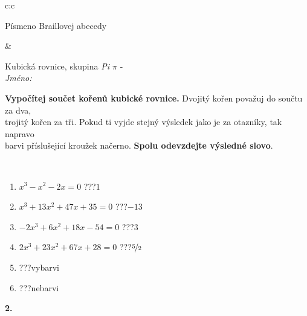 \documentclass[10pt]{report}
\begin{document}
\begin{tabular}{c:c}
\begin{minipage}[c][104.5mm][t]{0.5\linewidth}
\begin{center}
\begin{minipage}{0.20\linewidth}
\begin{center}
{\small Písmeno Braillovej abecedy}
\end{center}
\end{minipage}
\end{center}
\end{minipage}
&
\begin{minipage}[c][104.5mm][t]{0.5\linewidth}
\begin{center}
\vspace{7mm}
{\huge Kubická rovnice, skupina \textit{Pi $\pi$} -}\\[5mm]
\textit{Jméno:}\phantom{xxxxxxxxxxxxxxxxxxxxxxxxxxxxxxxxxxxxxxxxxxxxxxxxxxxxxxxxxxxxxxxxx}\\[5mm]
\begin{minipage}{0.95\linewidth}
\begin{center}
\textbf{Vypočítej součet kořenů kubické rovnice.} Dvojitý kořen považuj do součtu za dva,\\trojitý kořen za tři. Pokud ti vyjde stejný výsledek jako je za otazníky, tak napravo\\barvi příslušející kroužek načerno. \textbf{Spolu odevzdejte výsledné slovo}.
\end{center}
\end{minipage}
\\[1mm]
\begin{minipage}{0.79\linewidth}
\begin{center}
\begin{varwidth}{\linewidth}
\begin{enumerate}
\Large
\item $x^3-x^2-2x=0$\quad \dotfill\; ???\;\dotfill \quad $1$
\item $x^3+13x^2+47x+35=0$\quad \dotfill\; ???\;\dotfill \quad $-13$
\item $-2x^3+6x^2+18x-54=0$\quad \dotfill\; ???\;\dotfill \quad $3$
\item $2x^3+23x^2+67x+28=0$\quad \dotfill\; ???\;\dotfill \quad $\nicefrac{5}{2}$
\item \quad \dotfill\; ???\;\dotfill \quad vybarvi
\item \quad \dotfill\; ???\;\dotfill \quad nebarvi
\end{enumerate}
\end{varwidth}
\end{center}
\end{minipage}
\begin{minipage}{0.20\linewidth}
\begin{center}
{\Huge\bfseries 2.} \\[2mm]

\end{center}
\end{minipage}
\end{center}
\end{minipage}
\end{tabular}
\end{document}
